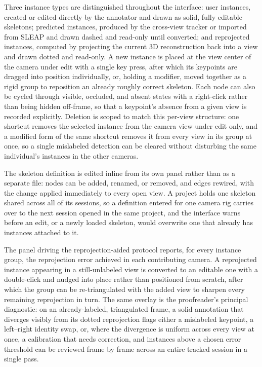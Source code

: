 \documentclass[pdflatex, sn-nature]{sn-jnl}
\theoremstyle{thmstyleone}%
\theoremstyle{thmstyletwo}%
\theoremstyle{thmstylethree}%
\begin{document}
Three instance types are distinguished throughout the interface: user instances, created or edited directly by the annotator and drawn as solid, fully editable skeletons; predicted instances, produced by the cross-view tracker or imported from SLEAP and drawn dashed and read-only until converted; and reprojected instances, computed by projecting the current 3D reconstruction back into a view and drawn dotted and read-only. A new instance is placed at the view center of the camera under edit with a single key press, after which its keypoints are dragged into position individually, or, holding a modifier, moved together as a rigid group to reposition an already roughly correct skeleton. Each node can also be cycled through visible, occluded, and absent states with a right-click rather than being hidden off-frame, so that a keypoint's absence from a given view is recorded explicitly. Deletion is scoped to match this per-view structure: one shortcut removes the selected instance from the camera view under edit only, and a modified form of the same shortcut removes it from every view in its group at once, so a single mislabeled detection can be cleared without disturbing the same individual's instances in the other cameras.

The skeleton definition is edited inline from its own panel rather than as a separate file: nodes can be added, renamed, or removed, and edges rewired, with the change applied immediately to every open view. A project holds one skeleton shared across all of its sessions, so a definition entered for one camera rig carries over to the next session opened in the same project, and the interface warns before an edit, or a newly loaded skeleton, would overwrite one that already has instances attached to it.

The panel driving the reprojection-aided protocol reports, for every instance group, the reprojection error achieved in each contributing camera. A reprojected instance appearing in a still-unlabeled view is converted to an editable one with a double-click and nudged into place rather than positioned from scratch, after which the group can be re-triangulated with the added view to sharpen every remaining reprojection in turn. The same overlay is the proofreader's principal diagnostic: on an already-labeled, triangulated frame, a solid annotation that diverges visibly from its dotted reprojection flags either a mislabeled keypoint, a left–right identity swap, or, where the divergence is uniform across every view at once, a calibration that needs correction, and instances above a chosen error threshold can be reviewed frame by frame across an entire tracked session in a single pass.
\end{document}
